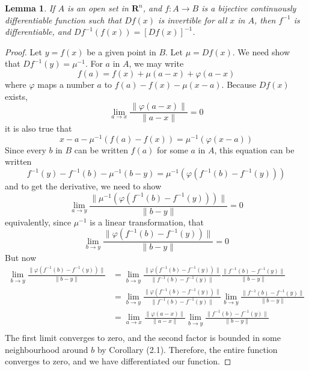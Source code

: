 \documentclass[12pt]{amsbook}
\theoremstyle{plain}
\newtheorem{lemma}[theorem]{Lemma}
\theoremstyle{definition}
\begin{document}
\begin{lemma}
    If $A$ is an open set in $\mathbf{R}^n$, and $f:A \to B$ is a bijective continuously differentiable function such that $Df(x)$ is invertible for all $x$ in $A$, then $f^{-1}$ is differentiable, and $Df^{-1}(f(x)) = [Df(x)]^{-1}$.
\end{lemma}
\begin{proof}
    Let $y = f(x)$ be a given point in $B$. Let $\mu = Df(x)$. We need show that $Df^{-1}(y) = \mu^{-1}$. For $a$ in $A$, we may write
    \[ f(a) = f(x) + \mu(a - x) + \varphi(a - x) \]
    where $\varphi$ maps a number $a$ to $f(a) - f(x) - \mu(x - a)$. Because $Df(x)$ exists,
    \[ \lim_{a \to x} \frac{\|\varphi(a - x)\|}{\|a - x\|} = 0 \]
    it is also true that
    \[ x - a - \mu^{-1}(f(a) - f(x)) = \mu^{-1}(\varphi(x - a)) \]
    Since every $b$ in $B$ can be written $f(a)$ for some $a$ in $A$, this equation can be written
    \[ f^{-1}(y) - f^{-1}(b) - \mu^{-1}(b - y) = \mu^{-1}(\varphi(f^{-1}(b) - f^{-1}(y))) \]
    and to get the derivative, we need to show
    \[ \lim_{a \to y} \frac{\| \mu^{-1}(\varphi(f^{-1}(b) - f^{-1}(y))) \|}{\|b - y\|} = 0 \]
    equivalently, since $\mu^{-1}$ is a linear transformation, that
    \[ \lim_{b \to y} \frac{\| \varphi(f^{-1}(b) - f^{-1}(y)) \|}{\|b - y\|} = 0 \]
    But now
    \begin{align*}
        \lim_{b \to y} \frac{\| \varphi(f^{-1}(b) - f^{-1}(y)) \|}{\|b - y\|} &= \lim_{b \to y} \frac{\| \varphi(f^{-1}(b) - f^{-1}(y)) \|}{\|f^{-1}(b) - f^{-1}(y) \|} \frac{\|f^{-1}(b) - f^{-1}(y)\|}{\|b - y\|}\\
        &= \lim_{b \to y} \frac{\| \varphi(f^{-1}(b) - f^{-1}(y)) \|}{\|f^{-1}(b) - f^{-1}(y) \|} \lim_{b \to y} \frac{\|f^{-1}(b) - f^{-1}(y)\|}{\|b - y\|}\\
        &= \lim_{a \to x} \frac{\| \varphi(a - x) \|}{\|a - x \|} \lim_{b \to y} \frac{\|f^{-1}(b) - f^{-1}(y)\|}{\|b - y\|}\\
    \end{align*}
    The first limit converges to zero, and the second factor is bounded in some neighbourhood around $b$ by Corollary (2.1). Therefore, the entire function converges to zero, and we have differentiated our function.
\end{proof}
\end{document}

